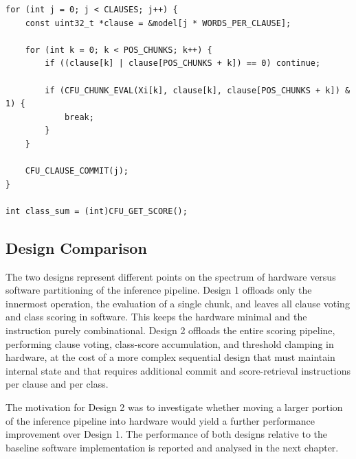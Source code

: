 \begin{code}
\label{lst:cfu2_c}
\begin{verbatim}
for (int j = 0; j < CLAUSES; j++) {
    const uint32_t *clause = &model[j * WORDS_PER_CLAUSE];

    for (int k = 0; k < POS_CHUNKS; k++) {
        if ((clause[k] | clause[POS_CHUNKS + k]) == 0) continue;

        if (CFU_CHUNK_EVAL(Xi[k], clause[k], clause[POS_CHUNKS + k]) & 1) {
            break;
        }
    }

    CFU_CLAUSE_COMMIT(j);
}

int class_sum = (int)CFU_GET_SCORE();
\end{verbatim}
\end{code}

\subsection{Design Comparison}
\label{sec:cfu_comparison}

The two designs represent different points on the spectrum of hardware versus
software partitioning of the inference pipeline. Design 1 offloads only the
innermost operation, the evaluation of a single chunk, and leaves all clause
voting and class scoring in software. This keeps the hardware minimal and the
instruction purely combinational. Design 2 offloads the entire scoring pipeline,
performing clause voting, class-score accumulation, and threshold clamping in
hardware, at the cost of a more complex sequential design that must maintain
internal state and that requires additional commit and score-retrieval
instructions per clause and per class.

The motivation for Design 2 was to investigate whether moving a larger portion
of the inference pipeline into hardware would yield a further performance
improvement over Design 1. The performance of both designs relative to the
baseline software implementation is reported and analysed in the next chapter.